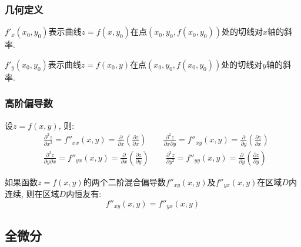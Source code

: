 \subsubsection{几何定义}
$ f'_{x}(x_{0},y_{0}) $表示曲线$ z=f(x,y_{0}) $在点$ (x_{0},y_{0},f(x_{0},y_{0})) $处的切线对$ x $轴的斜率.\par \vspace{.5em}
$ f'_{y}(x_{0},y_{0}) $表示曲线$ z=f(x_{0},y) $在点$ (x_{0},y_{0},f(x_{0},y_{0})) $处的切线对$ y $轴的斜率.
\subsubsection{高阶偏导数}
设$ z=f(x,y) $, 则:
\begin{equation*}
    \begin{aligned}
         & \frac{\partial^{2}z}{\partial x^{2}}=f''_{xx}(x,y)=\frac{\partial}{\partial x}(\frac{\partial z}{\partial x})\qquad \frac{\partial^{2}z}{\partial x \partial y}=f''_{xy}(x,y)=\frac{\partial }{\partial y}(\frac{\partial z}{\partial x})  \\
         & \frac{\partial^{2}z}{\partial y \partial x}=f''_{yx}(x,y)=\frac{\partial }{\partial x}(\frac{\partial z}{\partial y})\qquad \frac{\partial^{2}z}{\partial y^{2}}=f''_{yy}(x,y)=\frac{\partial }{\partial y}(\frac{\partial z}{\partial y})
    \end{aligned}
\end{equation*}\par
如果函数$ z=f(x,y) $的两个二阶混合偏导数$ f''_{xy}(x,y) $及$ f''_{yx}(x,y) $在区域$ D $内连续, 则在区域$ D $内恒友有:
\begin{equation*}
    f''_{xy}(x,y)=f''_{yx}(x,y)
\end{equation*}
\subsection{全微分}
